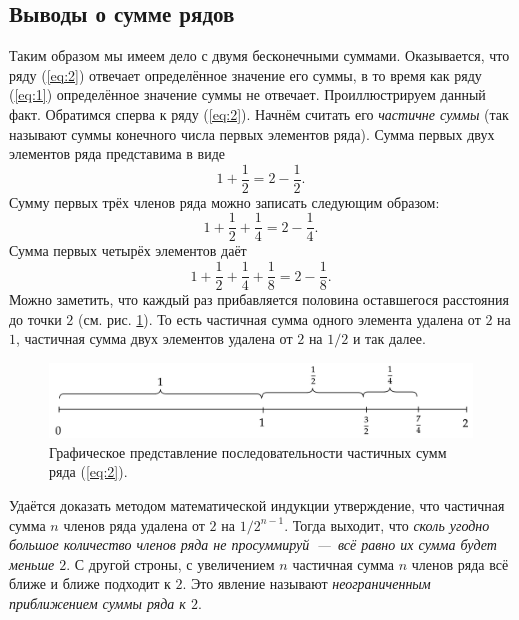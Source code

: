 \documentclass[12pt]{article}
\begin{document}
\subsection{Выводы о сумме рядов}
Таким образом мы имеем дело с двумя бесконечными суммами. Оказывается, что ряду (\ref{eq:2}) отвечает определённое значение его суммы, в то время как ряду (\ref{eq:1}) определённое значение суммы не отвечает. Проиллюстрируем данный факт. Обратимся сперва к ряду (\ref{eq:2}). Начнём считать его \emph{частичне суммы} (так называют суммы конечного числа первых элементов ряда). Сумма первых двух элементов ряда представима в виде
\begin{equation}
    1 + \dfrac12 = 2 - \dfrac12.
\end{equation}
Сумму первых трёх членов ряда можно записать следующим образом:
\begin{equation}
    1 + \dfrac12 + \dfrac14 = 2 - \dfrac14.
\end{equation}
Сумма первых четырёх элементов даёт
\begin{equation}
    1 + \dfrac12 + \dfrac14 + \dfrac18 = 2 - \dfrac18.
\end{equation}
Можно заметить, что каждый раз прибавляется половина оставшегося расстояния до точки $2$ (см. рис. \ref{fig:1}). То есть частичная сумма одного элемента удалена от $2$ на $1$, частичная сумма двух элементов удалена от $2$ на $1/2$ и так далее. 
\begin{figure}[ht]
    \centering
    \includegraphics[width = 1\textwidth]{fig1.png}
    \caption{Графическое представление последовательности частичных сумм ряда (\ref{eq:2}).}
    \label{fig:1}
\end{figure}
Удаётся доказать методом математической индукции утверждение, что частичная сумма $n$ членов ряда удалена от $2$ на $1/{2^{n-1}}$. Тогда выходит, что \emph{сколь угодно большое количество членов ряда не просуммируй~\----~всё равно их сумма будет меньше $2$}. С другой строны, с увеличением $n$ частичная сумма $n$ членов ряда всё ближе и ближе подходит к $2$. Это явление называют \emph{неограниченным приближением суммы ряда к $2$}.
\end{document}

